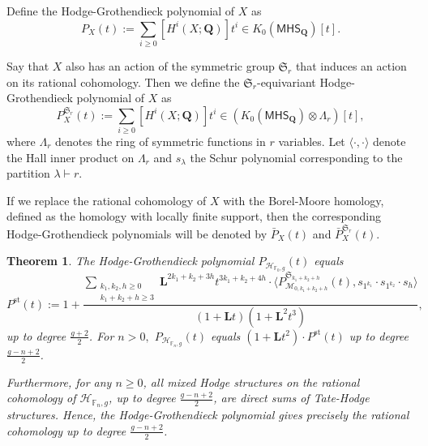 \documentclass[10pt,a4paper,twoside]{amsart}
\theoremstyle{plain}
\newtheorem{theo}{Theorem}[section]
\theoremstyle{definition}
\theoremstyle{remark}
\begin{document}
Define the Hodge-Grothendieck polynomial of $X$ as 
$$P_X(t):=\sum_{i \geq 0}\left[H^i(X;\mathbf{Q})\right]t^i\in K_0(\mathsf{MHS}_{\mathbf{Q}})\left[t\right].$$

Say that $X$ also has an action of the symmetric group  $\mathfrak{S}_r$ that induces an action on its rational cohomology. Then we define the $\mathfrak{S}_r\mbox{-}$equivariant Hodge-Grothendieck polynomial of $X$ as
$$P_X^{\mathfrak{S}_r}(t):=\sum_{i\geq 0} \left[H^i(X;\mathbf{Q})\right]t^i\in (K_0(\mathsf{MHS}_{\mathbf{Q}})\otimes \Lambda_r)\left[t\right],$$
where $\Lambda_r$ denotes the ring of symmetric functions in $r$ variables. 
Let $\langle\cdot,\cdot\rangle$ denote the Hall inner product on $\Lambda_r$ and $s_\lambda$ the Schur polynomial corresponding to the partition $\lambda\vdash r.$

If we replace the rational cohomology of $X$ with the Borel-Moore homology, defined as the homology with locally finite support, then the corresponding Hodge-Grothendieck polynomials will be denoted by $\bar{P}_X(t)$ and $\bar{P}^{\mathfrak{S}_r}_X(t)$.

 \begin{theo}\label{mainTheo} 
The Hodge-Grothendieck polynomial $P_{\mathcal{H}_{\mathbb{F}_0,g}}(t)$ equals 
\begin{equation*}
P^{\mathrm{st}}(t):=1+\frac{\sum_{\substack{{k_1,k_2,h \geq 0} \\k_1+k_2+h\geq3}
}\mathbf{L}^{2k_1+k_2+3h}t^{3k_1+k_2+4h}\cdot\langle P_{\mathcal{M}_{0,k_1+k_2+h}}^{\mathfrak{S}_{k_1+k_2+h}}(t),s_{1^{k_1}}\cdot s_{1^{k_2}}\cdot s_h\rangle}{(1+\mathbf{L}t)(1+\mathbf{L}^2t^3)},
\end{equation*}
up to degree $\frac{g+2}{2}$. 
For $n>0,$ $P_{\mathcal{H}_{\mathbb{F}_n,g}}(t)$ equals $(1+\mathbf{L}t^2)\cdot P^{\mathrm{st}}(t)$ 
up to degree $\frac{g-n+2}{2}$. 

Furthermore, for any $n\geq 0$, all mixed Hodge structures on the rational cohomology of $\mathcal{H}_{\mathbb{F}_{n},g}$, up to degree $\frac{g-n+2}{2}$, are direct sums of Tate-Hodge structures. Hence, the Hodge-Grothendieck polynomial 
gives precisely the rational cohomology up to degree $\frac{g-n+2}{2}$. 
\end{theo}
\end{document}
